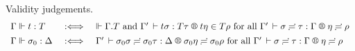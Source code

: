 \documentclass[acmlarge,review,anonymous]{acmart}\settopmatter{printfolios=true}
\begin{document}

Validity judgements.
\[
\begin{array}{l@{\quad}l@{\quad}l}
  \Gamma \valid t : T & \defas & %
    \valid \cext \Gamma T \mand
    \LR {\Gamma'} {t \sigma} {T \tau} {t \eta} {T \rho}
    \mforall \LRSub {\Gamma'} \sigma \tau \Gamma \eta \rho
\\[1ex]
  \Gamma \valid \sigma_0 : \Delta & \defas &
    \LRSub {\Gamma'} {\sigma_0 \sigma} {\sigma_0 \tau} \Delta {\sigma_0 \eta} {\sigma_0 \rho}
    \mforall \LRSub {\Gamma'} {\sigma} {\tau} \Gamma {\eta} {\rho}
\end{array}
\]
\end{document}
